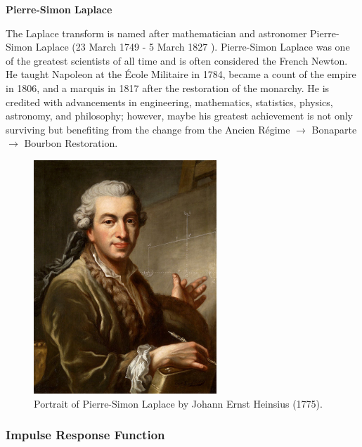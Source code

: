 \documentclass[12pt,letter]{article}
\begin{document}
\begin{review}
	\label{sec:Pierre-Simon_Laplace}
	
	\textbf{Pierre-Simon Laplace}

	\noindent The Laplace transform is named after mathematician and astronomer Pierre-Simon Laplace (23 March 1749 - 5 March 1827 ). Pierre-Simon Laplace was one of the greatest scientists of all time and is often considered the French Newton. He taught Napoleon at the \'Ecole Militaire in 1784, became a count of the empire in 1806, and a marquis in 1817 after the restoration of the monarchy. He is credited with advancements in engineering, mathematics, statistics, physics, astronomy, and philosophy; however, maybe his greatest achievement is not only surviving but benefiting from the change from the Ancien R\'egime $\rightarrow$ Bonaparte $\rightarrow$ Bourbon Restoration. 
		
	\begin{figure}[H]
		\centering
		\includegraphics[width=2.71in]{../figures/Pierre-Simon_de_Laplace.jpg}
		\caption{Portrait of Pierre-Simon Laplace by Johann Ernst Heinsius (1775).\protect\footnotemark[1] }
		\label{fig:fragility_curve}
	\end{figure}
	
	

	
\end{review}


\subsubsection{Impulse Response Function}
\end{document}
